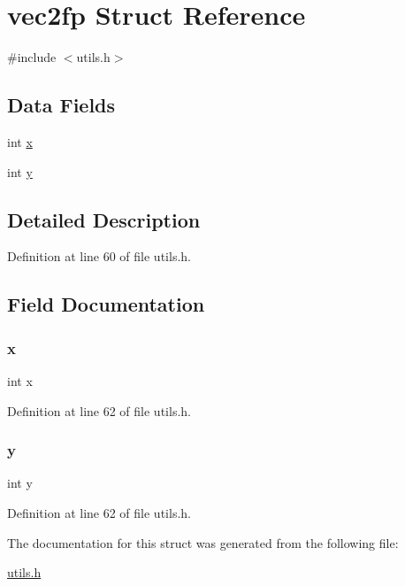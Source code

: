 \hypertarget{structvec2fp}{}\section{vec2fp Struct Reference}
\label{structvec2fp}


{\ttfamily \#include $<$utils.\+h$>$}

\subsection*{Data Fields}
\begin{DoxyCompactItemize}
\item 
int \mbox{\hyperlink{structvec2fp_a6150e0515f7202e2fb518f7206ed97dc}{x}}
\item 
int \mbox{\hyperlink{structvec2fp_a0a2f84ed7838f07779ae24c5a9086d33}{y}}
\end{DoxyCompactItemize}


\subsection{Detailed Description}


Definition at line 60 of file utils.\+h.



\subsection{Field Documentation}
\mbox{\label{structvec2fp_a6150e0515f7202e2fb518f7206ed97dc}} 
\subsubsection{\texorpdfstring{x}{x}}
{\footnotesize\ttfamily int x}



Definition at line 62 of file utils.\+h.

\mbox{\label{structvec2fp_a0a2f84ed7838f07779ae24c5a9086d33}} 
\subsubsection{\texorpdfstring{y}{y}}
{\footnotesize\ttfamily int y}



Definition at line 62 of file utils.\+h.



The documentation for this struct was generated from the following file\+:\begin{DoxyCompactItemize}
\item 
\mbox{\hyperlink{utils_8h}{utils.\+h}}\end{DoxyCompactItemize}
